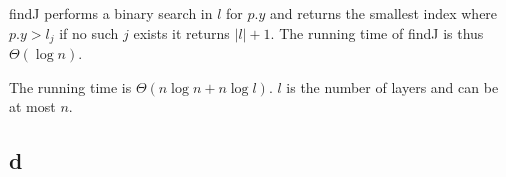\documentclass[koma,a4paper]{article}
\begin{document}
findJ performs a binary search in $l$ for $p.y$ and returns the smallest index where $p.y > l_j$ if no such $j$ exists it returns $|l| + 1$. The running time of findJ is thus $\Theta(\log n)$.

The running time is $\Theta(n \log n + n \log l)$. $l$ is the number of layers and can be at most $n$.

\subsection{d}
\end{document}
